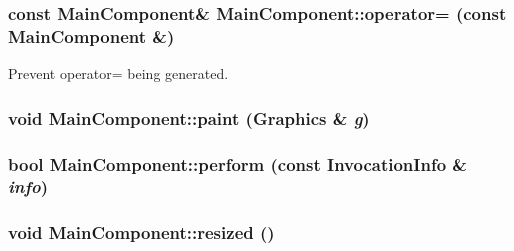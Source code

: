 \begin{CompactItemize}
\hypertarget{class_main_component_2527fa926f11b2bb58038e17ac11148c}{
\subsubsection[{operator=}]{\setlength{\rightskip}{0pt plus 5cm}const {\bf MainComponent}\& MainComponent::operator= (const {\bf MainComponent} \&)}}
\label{class_main_component_2527fa926f11b2bb58038e17ac11148c}


Prevent operator= being generated. 

\hypertarget{class_main_component_50314e605b634b982cd4550ee9e48139}{
\subsubsection[{paint}]{\setlength{\rightskip}{0pt plus 5cm}void MainComponent::paint (Graphics \& {\em g})}}
\label{class_main_component_50314e605b634b982cd4550ee9e48139}


\hypertarget{class_main_component_dd5b051a034f5cfef8584290af48b15c}{
\subsubsection[{perform}]{\setlength{\rightskip}{0pt plus 5cm}bool MainComponent::perform (const InvocationInfo \& {\em info})}}
\label{class_main_component_dd5b051a034f5cfef8584290af48b15c}


\hypertarget{class_main_component_175ec763d2e13c0140e17c1113662741}{
\subsubsection[{resized}]{\setlength{\rightskip}{0pt plus 5cm}void MainComponent::resized ()}}
\label{class_main_component_175ec763d2e13c0140e17c1113662741}


\hypertarget{class_main_component_f5189d8f0352afb781ba57404b732edb}{
}
\end{CompactItemize}
